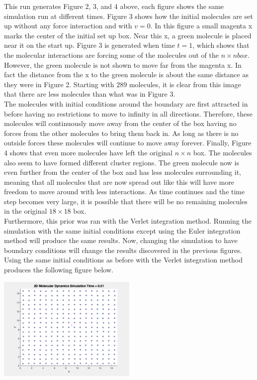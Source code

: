 \documentclass[reprint,amsmath,amssymb, aps, 10pt, a4paper, english, reqno]{revtex4-1}
\begin{document}
\begin{multicols}{2}
This run generates Figure 2, 3, and 4 above, each figure shows the same simulation run at different times. Figure 3 shows how the initial molecules are set up without any force interaction and with $v = 0$. In this figure a small magenta x marks the center of the initial set up box. Near this x, a green molecule is placed near it on the start up. Figure 3 is generated when time $t = 1$, which shows that the molecular interactions are forcing some of the molecules out of the $n \times n box$. However, the green molecule is not shown to move far from the magenta x. In fact the distance from the x to the green molecule is about the same distance as they were in Figure 2. Starting with $289$ molecules, it is clear from this image that there are less molecules than what was in Figure 3. \\

The molecules with initial conditions around the boundary are first attracted in before having no restrictions to move to infinity in all directions. Therefore, these molecules will continuously move away from the center of the box having no forces from the other molecules to bring them back in. As long as there is no outside forces these molecules will continue to move  away forever. Finally, Figure 4 shows that even more molecules have left the original $n \times n$ box. The molecules also seem to have formed different cluster regions. The green molecule now is even further from the center of the box and has less molecules surrounding it, meaning that all molecules that are now spread out like this will have more freedom to move around with less interactions. As time continues and the time step becomes very large, it is possible that there will be no remaining molecules in the original $18 \times 18$ box. \\

Furthermore, this prior was ran with the Verlet integration method. Running the simulation with the same initial conditions except using the Euler integration method will produce the same results. Now, changing the simulation to have boundary conditions will change the results discovered in the previous figures. Using the same initial conditions as before with the Verlet integration method produces the following figure below.

\begin{center}
    \includegraphics[width=0.50\textwidth]{position_n_289_t_0.01_bc.png}
    \caption{\small FIG 2: Initial molecule positions Molecule positions from Verlet integration numerical method.}
\end{center}


\end{multicols}
\end{document}
